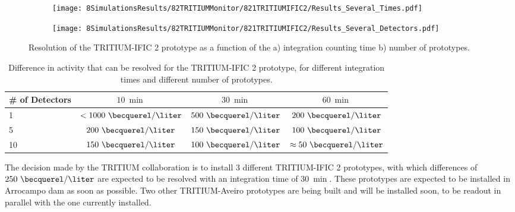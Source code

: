 \begin{figure}
\centering
    \begin{subfigure}[b]{0.75\textwidth}
    \centering
    \texttt{[image: 8SimulationsResults/82TRITIUMMonitor/821TRITIUMIFIC2/Results\_Several\_Times.pdf]}  
    \caption{\label{subfig:ResolutionvsIntegrationCoutingTime}}
    \end{subfigure}
    \hfill
    \begin{subfigure}[b]{0.75\textwidth}
    \centering
    \texttt{[image: 8SimulationsResults/82TRITIUMMonitor/821TRITIUMIFIC2/Results\_Several\_Detectors.pdf]}  
    \caption{\label{subfig:ResolutionvsNumberDetectors}}
    \end{subfigure}
 \caption{Resolution of the TRITIUM-IFIC 2 prototype as a function of the a) integration counting time b) number of prototypes.}
 \label{fig:Resolution}
\end{figure}

\begin{table}[htbp]
\centering{}%
\begin{tabular}{lccc}
\toprule 
\# of Detectors & $10~\min$ & $30~\min$ & $60~\min$ \tabularnewline
\midrule
\midrule 
1 & $<1000~\becquerel/\liter$ & $500~\becquerel/\liter$ & $200~\becquerel/\liter$ \tabularnewline
5 & $200~\becquerel/\liter$ & $150~\becquerel/\liter$ & $100~\becquerel/\liter$ \tabularnewline
10 & $150~\becquerel/\liter$ & $100~\becquerel/\liter$ & $\approx 50~\becquerel/\liter$ \tabularnewline
\bottomrule
\end{tabular}
\caption{Difference in activity that can be resolved for the TRITIUM-IFIC 2 prototype, for different integration times and different number of prototypes.}
\label{tab:DifferentCasesOfTI2}
\end{table}

The decision made by the TRITIUM collaboration is to install 3 different TRITIUM-IFIC 2 prototypes, with which differences of $250~\becquerel/\liter$ are expected to be resolved with an integration time of $30~\min$. These prototypes are expected to be installed  in Arrocampo dam as soon as possible. Two other TRITIUM-Aveiro prototypes are being built and will be installed soon, to be readout in parallel with the one currently installed.




